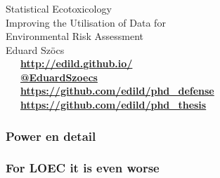 \documentclass[
	12pt
	]{beamer}
\begin{document}
\begin{frame}[standout]
	\frametitle{}

	\vspace{1em}
	\Huge{Statistical Ecotoxicology} \\[0.3em]
	\large{Improving the Utilisation of Data for \\ Environmental Risk Assessment} \\[1em]

	\normalsize
	Eduard Szöcs \\[3em]

	\faLaptop~~~\textbf{\href{http://edild.github.io/}{http://edild.github.io/ }}\\[.5em]
	\faTwitter~~~\textbf{\href{http://twitter.com/EduardSzoecs}{@EduardSzoecs}} 	\\[0.5em]
	\faFilePowerpointO~~~\textbf{\href{https://github.com/edild/phd_defense}{https://github.com/edild/phd\_defense}}\\[0.5em]
	\faBook~~~\textbf{\href{https://github.com/edild/phd_thesis}{https://github.com/edild/phd\_thesis}}\\[3em]

	\begin{center}\ccbysa\end{center} 

\end{frame}


\appendix

\begin{frame}
\frametitle{Power en detail}
	\begin{adjustbox}{max totalsize={\textwidth}{\textheight}}
				
	\end{adjustbox}
\end{frame}


\begin{frame}
\frametitle{For LOEC it is even worse}
	\begin{adjustbox}{max totalsize={\textwidth}{\textheight}}
				
	\end{adjustbox}
\end{frame}
\end{document}
